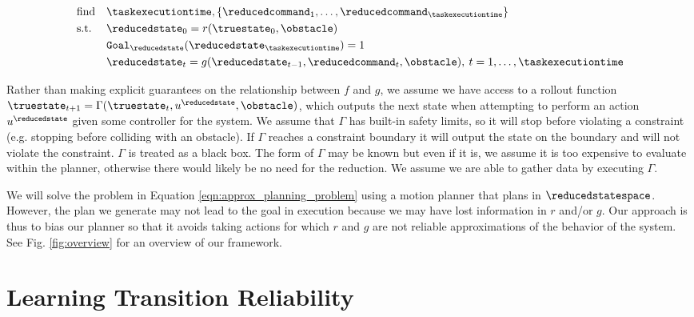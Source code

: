 \begin{equation}
    \begin{aligned}
        & \text{find}   & & \taskexecutiontime, \{\reducedcommand_1, \dots, \reducedcommand_{\taskexecutiontime} \} \\
        & \text{s.t.}   & & \reducedstate_0 = r(\truestate_0,\obstacle) \\
        &               & &  \texttt{Goal}_\reducedstate(\reducedstate_{\taskexecutiontime}) = 1\\
        &               & & \reducedstate_{t} = g(\reducedstate_{t-1},\reducedcommand_t,\obstacle), \:  t = 1, \dots, \taskexecutiontime \\
    \end{aligned}
    \label{eqn:approx_planning_problem}
\end{equation}

Rather than making explicit guarantees on the relationship between $f$ and $g$, we assume we have access to a rollout function $\truestate_{t+1} = \Gamma(\truestate_t,u^\reducedstate,\obstacle)$, which outputs the next state when attempting to perform an action $u^\reducedstate$ given some controller for the system. We assume that $\Gamma$ has built-in safety limits, so it will stop before violating a constraint (e.g. stopping before colliding with an obstacle). If $\Gamma$ reaches a constraint boundary it will output the state on the boundary and will not violate the constraint. $\Gamma$ is treated as a black box. The form of $\Gamma$ may be known but even if it is, we assume it is too expensive to evaluate within the planner, otherwise there would likely be no need for the reduction. We assume we are able to gather data by executing $\Gamma$.%

We will solve the problem in Equation \ref{eqn:approx_planning_problem} using a motion planner that plans in $\reducedstatespace$. However, the plan we generate may not lead to the goal in execution because we may have lost information in $r$ and/or $g$. Our approach is thus to bias our planner so that it avoids taking actions for which $r$ and $g$ are not reliable approximations of the behavior of the system. See Fig. \ref{fig:overview} for an overview of our framework.





\section{Learning Transition Reliability}


